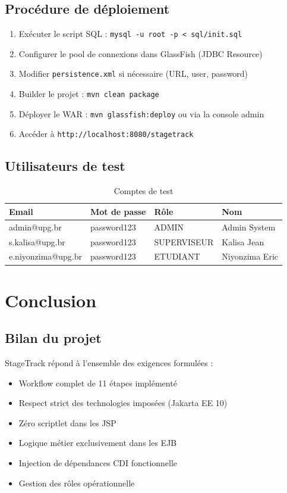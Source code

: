 \documentclass[12pt,a4paper]{report}
\begin{document}
\section{Procédure de déploiement}
\begin{enumerate}
    \item Exécuter le script SQL : \texttt{mysql -u root -p < sql/init.sql}
    \item Configurer le pool de connexions dans GlassFish (JDBC Resource)
    \item Modifier \texttt{persistence.xml} si nécessaire (URL, user, password)
    \item Builder le projet : \texttt{mvn clean package}
    \item Déployer le WAR : \texttt{mvn glassfish:deploy} ou via la console admin
    \item Accéder à \texttt{http://localhost:8080/stagetrack}
\end{enumerate}

\section{Utilisateurs de test}
\begin{table}[h]
\centering
\begin{tabular}{llll}
\toprule
\textbf{Email} & \textbf{Mot de passe} & \textbf{Rôle} & \textbf{Nom} \\
\midrule
admin@upg.br & password123 & ADMIN & Admin System \\
s.kalisa@upg.br & password123 & SUPERVISEUR & Kalisa Jean \\
e.niyonzima@upg.br & password123 & ETUDIANT & Niyonzima Eric \\
\bottomrule
\end{tabular}
\caption{Comptes de test}
\end{table}

\chapter{Conclusion}

\section{Bilan du projet}
StageTrack répond à l'ensemble des exigences formulées :
\begin{itemize}
    \item Workflow complet de 11 étapes implémenté
    \item Respect strict des technologies imposées (Jakarta EE 10)
    \item Zéro scriptlet dans les JSP
    \item Logique métier exclusivement dans les EJB
    \item Injection de dépendances CDI fonctionnelle
    \item Gestion des rôles opérationnelle
\end{itemize}
\end{document}

